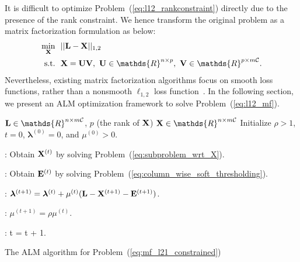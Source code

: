 \documentclass[letterpaper]{article}
\def\bE{{\bf E}}
\def\blambda{{\bm \lambda}}
\def\calC{{\mathcal{C}}}
\def\bL{{\bf L}}
\def\bU{{\bf U}}
\def\bV{{\bf V}}
\def\dsR{\mathds{R}}
\def\bX{{\bf X}}
\def\bX{{\bf X}}
\def\st{{\text{s.t.}}}
\begin{document}
It is difficult to optimize Problem~(\ref{eq:l12_rankconstraint}) directly due to the presence of the rank constraint.
We hence transform the original problem as a matrix factorization formulation as below:
\begin{align}\label{eq:l12_mf}
  \min_{\bX} ~&~ || \bL - \bX ||_{1,2}   \nonumber \\
         \st ~&~ \bX = \bU \bV,~\bU \in \dsR^{n \times p},~\bV \in \dsR^{p \times m\calC}  .
\end{align}
\noindent
Nevertheless, existing matrix factorization algorithms focus on smooth loss functions, rather than a nonsmooth $\ell_{1,2}$ loss function~\cite{tanicml2014riemannian,vandereycken2013lowrank,Wen2012,ngonips2012scaled,rtrmc2011boumal}.
In the following section, we present an ALM optimization framework to solve Problem~(\ref{eq:l12_mf}).



\begin{small}
\begin{algorithm}[h!]

\begin{algorithmic}

\REQUIRE $\bL \in \dsR^{n \times m\calC}$, $p$ (the rank of $\bX$)
\ENSURE $\bX \in \dsR^{n \times m\calC}$
\STATE Initialize $\rho > 1$, $t = 0$, $\blambda^{(0)} = 0$, and $\mu^{(0)} > 0$.



    : Obtain $\bX^{(t)}$ by solving Problem~(\ref{eq:subproblem_wrt_X}).

    : Obtain $\bE^{(t)}$ by solving Problem~(\ref{eq:column_wise_soft_thresholding}).

  \ENDWHILE

  : $\blambda^{(t+1)} = \blambda^{(t)} + \mu^{(t)} (\bL - \bX^{(t+1)} - \bE^{(t+1)})$.

  : $\mu^{(t+1)} = \rho \mu^{(t)}$.

  : t = t + 1.

\ENDWHILE

\end{algorithmic}
\caption{The ALM algorithm for Problem~(\ref{eq:mf_l21_constrained})}
\label{alg:alm_mf}
\end{algorithm}
\end{small}
\end{document}

